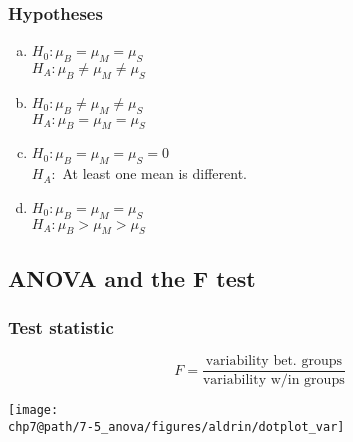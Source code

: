 \documentclass[slidestop,compress,mathserif]{beamer}
\makeatletter
\def\chp7@path{../../Chp 7}
\makeatother
\begin{document}
\begin{frame}
\frametitle{Hypotheses}


\begin{enumerate}[(a)]
\item $H_0: \mu_B = \mu_M = \mu_S$ \\
$H_A: \mu_B \ne \mu_M \ne \mu_S$ \\
\item $H_0: \mu_B \ne \mu_ M \ne \mu_S$ \\
$H_A: \mu_B = \mu_M = \mu_S$ \\
\item $H_0: \mu_B = \mu_M = \mu_S = 0$ \\
$H_A:$ At least one mean is different.
\item $H_0: \mu_B = \mu_M = \mu_S$ \\
$H_A: \mu_B > \mu_M > \mu_S$ \\
\end{enumerate}

\end{frame}


\subsection{ANOVA and the F test}


\begin{frame}
\frametitle{Test statistic}


\[ F = \frac{\text{variability bet. groups}}{\text{variability w/in groups}}  \]

\begin{center}
\texttt{[image: \\chp7@path/7-5\_anova/figures/aldrin/dotplot\_var]}
\end{center}

\end{frame}


%
%
%
%
%
%
%
\end{document}
